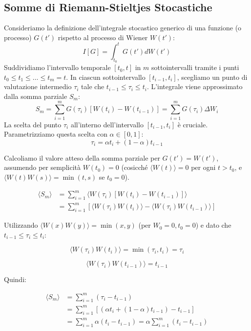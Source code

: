 \subsection{Somme di Riemann-Stieltjes Stocastiche}
Consideriamo la definizione dell'integrale stocastico generico di una funzione (o processo) $G(t')$ rispetto al processo di Wiener $W(t')$:
\begin{equation}
I[G] = \int_{t_0}^t G(t')dW(t')
\end{equation}
Suddividiamo l'intervallo temporale $[t_0, t]$ in $m$ sottointervalli tramite i punti $t_0 \le t_1 \le \dots \le t_m = t$.
In ciascun sottointervallo $[t_{i-1}, t_i]$, scegliamo un punto di valutazione intermedio $\tau_i$ tale che $t_{i-1} \le \tau_i \le t_i$.
L'integrale viene approssimato dalla somma parziale $S_m$:
\begin{equation}
S_m = \sum_{i=1}^m G(\tau_i)[W(t_i) - W(t_{i-1})] = \sum_{i=1}^m G(\tau_i)\Delta W_i
\end{equation}
La scelta del punto $\tau_i$ all'interno dell'intervallo $[t_{i-1}, t_i]$ è cruciale. Parametrizziamo questa scelta con $\alpha \in [0, 1]$:
\begin{equation}
\tau_i = \alpha t_i + (1-\alpha) t_{i-1}
\end{equation}

Calcoliamo il valore atteso della somma parziale per $G(t')=W(t')$, assumendo per semplicità $W(t_0)=0$ (cosicché $\langle W(t) \rangle = 0$ per ogni $t>t_0$, e $\langle W(t)W(s) \rangle = \min(t,s)$ se $t_0=0$).


\begin{align}
\langle S_m \rangle &= \sum_{i=1}^m \langle W(\tau_i)[W(t_i) - W(t_{i-1})] \rangle \nonumber \\
&= \sum_{i=1}^m [\langle W(\tau_i)W(t_i) \rangle - \langle W(\tau_i)W(t_{i-1}) \rangle]
\end{align}


Utilizzando $\langle W(x)W(y) \rangle = \min(x,y)$ (per $W_0=0, t_0=0$) e dato che $t_{i-1} \le \tau_i \le t_i$:

$$
\langle W(\tau_i)W(t_i) \rangle = \min(\tau_i, t_i) = \tau_i
$$

$$
\langle W(\tau_i)W(t_{i-1}) \rangle =  t_{i-1}
$$

Quindi:


\begin{align}
\langle S_m \rangle &= \sum_{i=1}^m (\tau_i - t_{i-1}) \nonumber \\
&= \sum_{i=1}^m [(\alpha t_i + (1-\alpha)t_{i-1}) - t_{i-1}] \nonumber \\
&= \sum_{i=1}^m \alpha(t_i - t_{i-1}) = \alpha \sum_{i=1}^m (t_i - t_{i-1})
\end{align}


